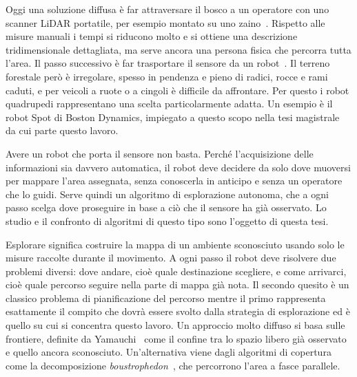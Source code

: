Oggi una soluzione diffusa è far attraversare il bosco a un operatore con uno scanner LiDAR portatile, per esempio montato su uno zaino~\cite{gennai2026}. Rispetto alle misure manuali i tempi si riducono molto e si ottiene una descrizione tridimensionale dettagliata, ma serve ancora una persona fisica che percorra tutta l'area. Il passo successivo è far trasportare il sensore da un robot~\cite{mattamala2025}. Il terreno forestale però è irregolare, spesso in pendenza e pieno di radici, rocce e rami caduti, e per veicoli a ruote o a cingoli è difficile da affrontare. Per questo i robot quadrupedi rappresentano una scelta particolarmente adatta. Un esempio è il robot Spot di Boston Dynamics, impiegato a questo scopo nella tesi magistrale~\cite{gennai2026} da cui parte questo lavoro.

Avere un robot che porta il sensore non basta. Perché l'acquisizione delle informazioni sia davvero automatica, il robot deve decidere da solo dove muoversi per mappare l'area assegnata, senza conoscerla in anticipo e senza un operatore che lo guidi. Serve quindi un algoritmo di esplorazione autonoma, che a ogni passo scelga dove proseguire in base a ciò che il sensore ha già osservato. Lo studio e il confronto di algoritmi di questo tipo sono l'oggetto di questa tesi.

Esplorare significa costruire la mappa di un ambiente sconosciuto usando solo le misure raccolte durante il movimento. A ogni passo il robot deve risolvere due problemi diversi: dove andare, cioè quale destinazione scegliere, e come arrivarci, cioè quale percorso seguire nella parte di mappa già nota. Il secondo quesito è un classico problema di pianificazione del percorso mentre il primo rappresenta esattamente il compito che dovrà essere svolto dalla strategia di esplorazione ed è quello su cui si concentra questo lavoro. Un approccio molto diffuso si basa sulle frontiere, definite da Yamauchi~\cite{yamauchi1997} come il confine tra lo spazio libero già osservato e quello ancora sconosciuto. Un'alternativa viene dagli algoritmi di copertura come la decomposizione \textit{boustrophedon}~\cite{choset2000}, che percorrono l'area a fasce parallele.

